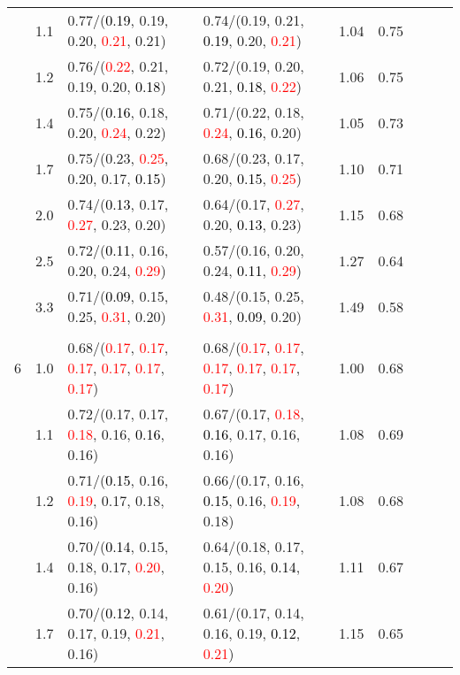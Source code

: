 \documentclass[10pt,a4paper]{report}
\begin{document}
\begin{table}[!htbp]
\begin{center}
{\begin{tabular}{ccllccccc}
			&1.1&0.77/(\textcolor{black}{0.19}, 0.19, 0.20, \textcolor{red}{0.21}, 0.21)&0.74/(0.19, 0.21, \textcolor{black}{0.19}, 0.20, \textcolor{red}{0.21})&1.04&0.75\\
			&1.2&0.76/(\textcolor{red}{0.22}, 0.21, 0.19, 0.20, \textcolor{black}{0.18})&0.72/(0.19, 0.20, 0.21, \textcolor{black}{0.18}, \textcolor{red}{0.22})&1.06&0.75\\
			&1.4&0.75/(\textcolor{black}{0.16}, 0.18, 0.20, \textcolor{red}{0.24}, 0.22)&0.71/(0.22, 0.18, \textcolor{red}{0.24}, \textcolor{black}{0.16}, 0.20)&1.05&0.73\\
			&1.7&0.75/(0.23, \textcolor{red}{0.25}, 0.20, 0.17, \textcolor{black}{0.15})&0.68/(0.23, 0.17, 0.20, \textcolor{black}{0.15}, \textcolor{red}{0.25})&1.10&0.71\\
			&2.0&0.74/(\textcolor{black}{0.13}, 0.17, \textcolor{red}{0.27}, 0.23, 0.20)&0.64/(0.17, \textcolor{red}{0.27}, 0.20, \textcolor{black}{0.13}, 0.23)&1.15&0.68\\
			&2.5&0.72/(\textcolor{black}{0.11}, 0.16, 0.20, 0.24, \textcolor{red}{0.29})&0.57/(0.16, 0.20, 0.24, \textcolor{black}{0.11}, \textcolor{red}{0.29})&1.27&0.64\\
			&3.3&0.71/(\textcolor{black}{0.09}, 0.15, 0.25, \textcolor{red}{0.31}, 0.20)&0.48/(0.15, 0.25, \textcolor{red}{0.31}, \textcolor{black}{0.09}, 0.20)&1.49&0.58\\
			&&&&\\
			6			&1.0&0.68/(\textcolor{red}{0.17}, \textcolor{red}{0.17}, \textcolor{red}{0.17}, \textcolor{red}{0.17}, \textcolor{red}{0.17}, \textcolor{red}{0.17})&0.68/(\textcolor{red}{0.17}, \textcolor{red}{0.17}, \textcolor{red}{0.17}, \textcolor{red}{0.17}, \textcolor{red}{0.17}, \textcolor{red}{0.17})&1.00&0.68\\
			&1.1&0.72/(0.17, 0.17, \textcolor{red}{0.18}, 0.16, \textcolor{black}{0.16}, 0.16)&0.67/(0.17, \textcolor{red}{0.18}, \textcolor{black}{0.16}, 0.17, 0.16, 0.16)&1.08&0.69\\
			&1.2&0.71/(\textcolor{black}{0.15}, 0.16, \textcolor{red}{0.19}, 0.17, 0.18, 0.16)&0.66/(0.17, 0.16, \textcolor{black}{0.15}, 0.16, \textcolor{red}{0.19}, 0.18)&1.08&0.68\\
			&1.4&0.70/(\textcolor{black}{0.14}, 0.15, 0.18, 0.17, \textcolor{red}{0.20}, 0.16)&0.64/(0.18, 0.17, 0.15, 0.16, \textcolor{black}{0.14}, \textcolor{red}{0.20})&1.11&0.67\\
			&1.7&0.70/(\textcolor{black}{0.12}, 0.14, 0.17, 0.19, \textcolor{red}{0.21}, 0.16)&0.61/(0.17, 0.14, 0.16, 0.19, \textcolor{black}{0.12}, \textcolor{red}{0.21})&1.15&0.65\\

\end{tabular}}
\end{center}
\end{table}
\end{document}
